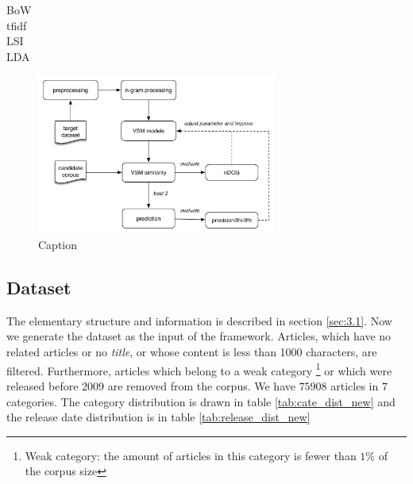 \begin{description}
\item[BoW]
\item[tfidf]
\item[LSI]
\item[LDA]
\end{description}


\begin{figure}[!htb]
    \centering
    \includegraphics[width=0.7\textwidth]{fig/unsupervised}
    \caption{Caption}
    \label{fig:unsupervised}
\end{figure}



\subsection{Dataset}

The elementary structure and information is described in section \ref{sec:3.1}. Now we generate the dataset as the input of the framework. Articles, which have no related articles or no \textit{title}, or whose content is less than 1000 characters, are filtered. Furthermore, articles which belong to a weak category \footnote{Weak category: the amount of articles in this category is fewer than $1\%$ of the corpus size} or which were released before 2009 are removed from the corpus. We have $75908$ articles in $7$ categories. The category distribution is drawn in table \ref{tab:cate_dist_new} and the release date distribution is in table \ref{tab:release_dist_new}


